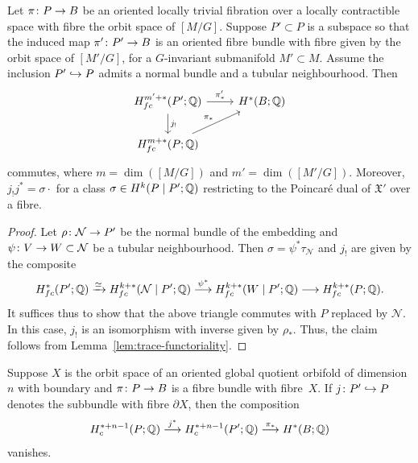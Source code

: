\documentclass[AHL,Unicode,longabstracts]{cedram}
\newcommand{\sub}{\subset}
\newcommand{\cl}{\colon}
\newcommand{\del}{\partial}
\newcommand{\bQ}{\mathbb{Q}}
\newcommand{\cN}{\mathcal{N}}
\newcommand{\fX}{\mathfrak{X}}
\newcommand{\xra}{\xrightarrow}
\renewcommand*{\to}{\mathchoice{\longrightarrow}{\rightarrow}{\rightarrow}{\rightarrow}}
\newcommand{\longhookrightarrow}{\lhook\joinrel\longrightarrow}
\newcommand*{\hookto}{\mathchoice{\longhookrightarrow}{\hookrightarrow}{\hookrightarrow}{\hookrightarrow}}
\let\oldin\in
\renewcommand{\in}{\mathchoice{\oldin}{\oldin}{\,\oldin\,}{\,\oldin\,}}
\begin{document}
\begin{lemm}\label{lem:trace-subfibration}
Let $\pi \cl P \to B$ be an oriented locally trivial fibration over a locally contractible space with fibre the orbit space of $[M/G]$. Suppose $P'\subset P$ is a subspace so that the induced map $\pi'\cl P'\to B$ is an oriented fibre bundle with fibre given by the orbit space of $[M'/G]$, for a $G$-invariant submanifold $M'\sub M$. Assume the inclusion $P'\hookto P$ admits a normal bundle and a tubular neighbourhood. Then
\[
\begin{tikzcd}
H^{m'+*}_{fc}(P';\bQ)\arrow[r,"\pi'_*"] \arrow[d,"{j_!}"] & H^*(B;\bQ)\\
H^{m+*}_{fc}(P;\bQ) \arrow[ur,"\pi_*"]
\end{tikzcd}
\]
commutes, where $m = \dim([M/G])$ and $m' = \dim([M'/G])$. Moreover, $j_!j^* = \sigma\cdot$ for a class $\sigma \in H^k(P\mid P';\bQ)$ restricting to the Poincaré dual of $\fX'$ over a fibre.
\end{lemm}

\begin{proof}
Let $\rho\cl\cN \to P'$ be the normal bundle of the embedding and $\psi \cl V\to W\sub \cN$ be a tubular neighbourhood. Then $\sigma =\psi^*\tau_{\cN}$ and $j_!$ are given by the composite
\[
H^*_{fc}(P';\bQ)\xra{\simeq} H^{k+*}_{fc}(\cN\mid P';\bQ) \overset{\psi^*}{\to} H^{k+*}_{fc}(W\mid P';\bQ) \to H^{k+*}_{fc}(P;\bQ).
\]
It suffices thus to show that the above triangle commutes with $P$ replaced by $\cN$. In this case, $j_!$ is an isomorphism with inverse given by $\rho_*$. Thus, the claim follows from Lemma~\ref{lem:trace-functoriality}.
\end{proof}


\begin{lemm}\label{boundary-integration}
Suppose $X$ is the orbit space of an oriented global quotient orbifold of dimension $n$ with boundary and $\pi \cl P \to B$ is a fibre bundle with fibre~$X$. If $j\cl P'\hookto P$ denotes the subbundle with fibre $\del X$, then the composition
\[
H^{*+ n-1}_c(P;\bQ)\overset{j^*}{\to} H^{*+n-1}_c(P';\bQ)\overset{\pi_*}{\to} H^*(B;\bQ)
\]
vanishes.
\end{lemm}
\end{document}
